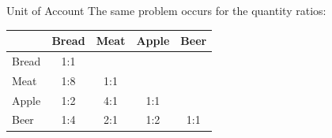 \documentclass[]{beamer}
\begin{document}
\begin{frame}{Unit of Account}
	The same problem occurs for the quantity ratios:
	\vspace{1em}
	\begin{center}
		\begin{tabular}{l||c|c|c|c}
       			& Bread & Meat & Apple & Beer \\ \hline \hline
			Bread    & 1:1 & \cellcolor{highlight!50} & \cellcolor{highlight!50} & \cellcolor{highlight!50} \\ \hline
			Meat &   1:8   & 1:1 & \cellcolor{highlight!50} & \cellcolor{highlight!50} \\ \hline
			Apple  &   1:2  &    4:1 & 1:1 & \cellcolor{highlight!50} \\ \hline
			Beer    &   1:4  &    2:1  &  1:2    & 1:1     
		\end{tabular}
	\end{center}
	\vspace{1.5em}
\end{frame}
\end{document}
